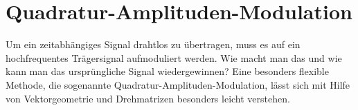 %
%
%
\section{Quadratur-Amplituden-Modulation
\label{section:quadratur-amplituden-modulation}}
Um ein zeitabhängiges Signal drahtlos zu übertragen, muss es auf
ein hochfrequentes Trägersignal aufmoduliert werden.
Wie macht man das und wie kann man das ursprüngliche Signal
wiedergewinnen?
Eine besonders flexible Methode, die sogenannte
Quadratur-Amplituden-Modu\-lation, lässt sich mit Hilfe von Vektorgeometrie
und Drehmatrizen besonders leicht verstehen.












